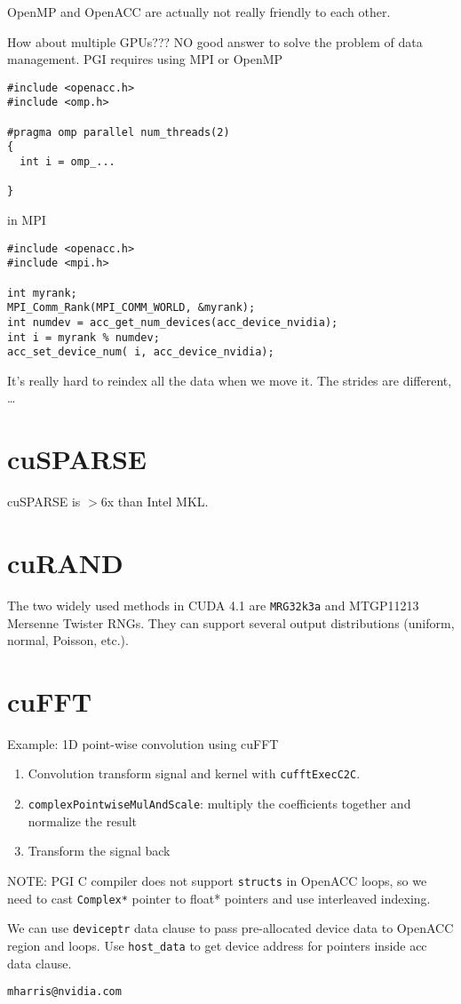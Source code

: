 OpenMP and OpenACC are actually not really friendly to each other. 


How about multiple GPUs??? NO good answer to solve the problem of data
management. PGI requires using MPI or OpenMP

\begin{verbatim}
#include <openacc.h>
#include <omp.h>

#pragma omp parallel num_threads(2) 
{ 
  int i = omp_...
  
}
\end{verbatim}
in MPI
\begin{verbatim}
#include <openacc.h>
#include <mpi.h>

int myrank;
MPI_Comm_Rank(MPI_COMM_WORLD, &myrank);
int numdev = acc_get_num_devices(acc_device_nvidia);
int i = myrank % numdev;
acc_set_device_num( i, acc_device_nvidia);
\end{verbatim}

It's really hard to reindex all the data when we move it. The strides are
different, \ldots

\section{cuSPARSE}

cuSPARSE is $> 6$x than Intel MKL. 


\section{cuRAND}

The two widely used methods in CUDA 4.1 are \verb!MRG32k3a! and MTGP11213
Mersenne Twister RNGs. They can support several output distributions (uniform,
normal, Poisson, etc.). 

\section{cuFFT}


Example: 1D point-wise convolution using cuFFT
\begin{enumerate}
  \item Convolution transform signal and kernel with \verb!cufftExecC2C!.
  
  \item \verb!complexPointwiseMulAndScale!: multiply the coefficients together
  and normalize the result
  
  \item Transform the signal back
\end{enumerate}

NOTE: PGI C compiler does not support \verb!structs! in OpenACC loops, so we
need to cast \verb!Complex*! pointer to float* pointers and use interleaved
indexing. 

We can use \verb!deviceptr! data clause to pass pre-allocated device data to
OpenACC region and loops. Use \verb!host_data! to get device address for
pointers inside acc data clause. 

\verb!mharris@nvidia.com!
